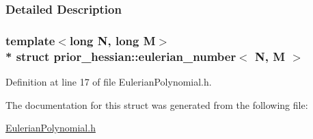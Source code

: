 \subsubsection{Detailed Description}
\subsubsection*{template$<$long N, long M$>$\\*
struct prior\+\_\+hessian\+::eulerian\+\_\+number$<$ N, M $>$}



Definition at line 17 of file Eulerian\+Polynomial.\+h.



The documentation for this struct was generated from the following file\+:\begin{DoxyCompactItemize}
\item 
\hyperlink{EulerianPolynomial_8h}{Eulerian\+Polynomial.\+h}\end{DoxyCompactItemize}
